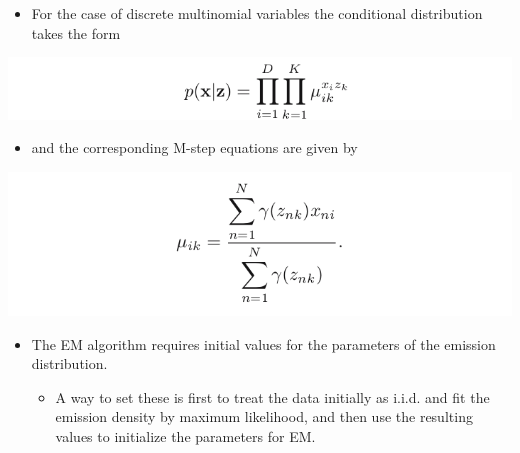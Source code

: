 \documentclass[11pt]{article}
\begin{document}
\begin{itemize}
\item For the case of discrete multinomial variables the conditional distribution takes the form
\end{itemize}
\begin{center}
\includegraphics[width=.9\linewidth]{Sequential Data/screenshot_2018-11-04_09-59-08.png}
\end{center}
\begin{itemize}
\item and the corresponding M-step equations are given by
\end{itemize}
\begin{center}
\includegraphics[width=.9\linewidth]{Sequential Data/screenshot_2018-11-04_09-59-28.png}
\end{center}
\begin{itemize}
\item The EM algorithm requires initial values for the parameters of the emission distribution.
\begin{itemize}
\item A way to set these is first to treat the data initially as i.i.d. and fit the emission density by maximum likelihood, and then use the resulting values to initialize the parameters for EM.
\end{itemize}
\end{itemize}
\end{document}
